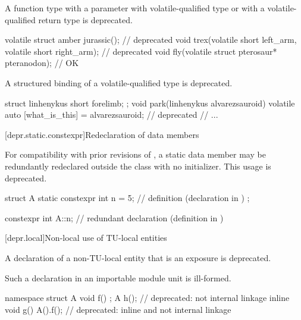 \pnum
A function type
with a parameter with volatile-qualified type or
with a volatile-qualified return type is deprecated.

\begin{example}
\begin{codeblock}
volatile struct amber jurassic();                               // deprecated
void trex(volatile short left_arm, volatile short right_arm);   // deprecated
void fly(volatile struct pterosaur* pteranodon);                // OK
\end{codeblock}
\end{example}


\pnum
A structured binding of a volatile-qualified type
is deprecated.

\begin{example}
\begin{codeblock}
struct linhenykus { short forelimb; };
void park(linhenykus alvarezsauroid) {
  volatile auto [what_is_this] = alvarezsauroid;                // deprecated
  // ...
}
\end{codeblock}
\end{example}


[depr.static.constexpr]{Redeclaration of  data members}

\pnum
For compatibility with prior revisions of \Cpp{}, a 
static data member may be redundantly redeclared outside the class with no initializer.
This usage is deprecated.
\begin{example}
\begin{codeblock}
struct A {
  static constexpr int n = 5;   // definition (declaration in \CppXIV{})
};

constexpr int A::n;             // redundant declaration (definition in \CppXIV{})
\end{codeblock}
\end{example}

[depr.local]{Non-local use of TU-local entities}

\pnum
A declaration of a non-TU-local entity that is an exposure
is deprecated.
\begin{note}
Such a declaration in an importable module unit is ill-formed.
\end{note}
\begin{example}
\begin{codeblock}
namespace {
  struct A {
    void f() {}
  };
}
A h();                          // deprecated: not internal linkage
inline void g() {A().f();}      // deprecated: inline and not internal linkage
\end{codeblock}
\end{example}

